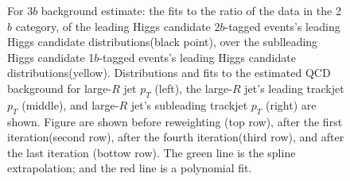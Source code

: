 \begin{figure}[htbp!]
\begin{center}
\caption{For 3$b$ background estimate: the fits to the ratio of the data in the 2$b$ category, of the leading Higgs candidate 2$b$-tagged events's leading Higgs candidate distributions(black point), over the sublleading Higgs candidate 1$b$-tagged events's leading Higgs candidate distributions(yellow). Distributions and fits to the estimated QCD background for large-$R$ jet $p_{T}$ (left),  the large-$R$ jet's leading trackjet $p_T$ (middle), and large-$R$ jet's subleading trackjet $p_T$ (right) are shown.  Figure are shown before reweighting (top row), after the first iteration(second row), after the fourth iteration(third row), and after the last iteration (bottow row). The green line is the spline extrapolation; and the red line is a polynomial fit.}
\label{fig:rw-3b-subl}
\end{center}
\end{figure}

